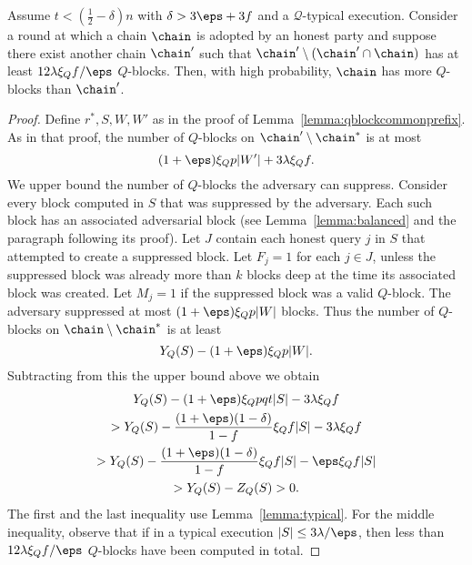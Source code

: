 \begin{lemma}\label{lemma:qblockcommonprefix12}
	Assume $t<(\frac12-\delta)n$ with $\delta>3\eps+3f$ and a $\mathcal{Q}$-typical
	execution.
	Consider a round at which a chain $\chain$ is adopted by an honest party and
	suppose there exist another chain $\chain'$ such that
	$\chain'\setminus(\chain'\cap\chain)$ has at least $12\lambda\xi_Qf/\eps$ $Q$-blocks.
	Then, with high probability, $\chain$ has more $Q$-blocks than $\chain'$.
\end{lemma}
\begin{proof}
	Define $r^*,S,W,W'$ as in the proof of
	Lemma~\ref{lemma:qblockcommonprefix}. As in that proof,
	the number of $Q$-blocks on $\chain'\setminus\chain^*$ is
	at most
	\[
		(1+\eps)\xi_Qp|W'|+3\lambda\xi_Qf
	.\]
	We upper bound the number of $Q$-blocks the adversary can suppress.
	Consider every block computed in $S$ that was suppressed by the
	adversary. Each such block has an associated adversarial block (see
	Lemma~\ref{lemma:balanced} and the paragraph following its proof).
	Let $J$ contain each honest query $j$ in $S$ that attempted to create
	a suppressed block.
	Let $F_j=1$ for each $j\in J$, unless the suppressed block was already
	more than $k$ blocks deep at the time its associated block was
	created.
	Let $M_j=1$ if the suppressed block was a valid $Q$-block.
	The adversary suppressed at most
	$(1+\eps)\xi_Qp|W|$ blocks. Thus
	the number of $Q$-blocks on $\chain\setminus\chain^*$ is at least
	\[
		Y_Q(S)-(1+\eps)\xi_Qp|W|
	.\]
	Subtracting from this the upper bound above we obtain
	\begin{multline*}
		Y_Q(S)-(1+\eps)\xi_Qpqt|S|-3\lambda\xi_Qf\\
		>Y_Q(S)-\frac{(1+\eps)(1-\delta)}{1-f}\xi_Qf|S|-3\lambda\xi_Qf\\
		>Y_Q(S)-\frac{(1+\eps)(1-\delta)}{1-f}\xi_Qf|S|-\eps\xi_Qf|S|\\
		>Y_Q(S)-Z_Q(S)>0
	.\end{multline*}
	The first and the last inequality use Lemma~\ref{lemma:typical}. For
	the middle inequality, observe that if in a typical execution
	$|S|\le3\lambda/\eps$, then less than $12\lambda\xi_Qf/\eps$ $Q$-blocks
	have been computed in total.
\end{proof}
